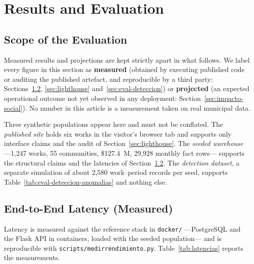 \documentclass[runningheads]{llncs}
\renewcommand{\_}{\origunderscore\allowbreak}
\begin{document}
\section{Results and Evaluation}
\label{sec:resultados}

\subsection{Scope of the Evaluation}
\label{sec:alcance}
\begingroup
Measured results and projections are kept strictly apart in what follows. We label every figure in this section as \textbf{measured} (obtained by executing published code or auditing the published artefact, and reproducible by a third party: Sections~\ref{sec:objetivos}, \ref{sec:lighthouse} and~\ref{sec:eval-deteccion}) or \textbf{projected} (an expected operational outcome not yet observed in any deployment: Section~\ref{sec:impacto-social}). No number in this article is a measurement taken on real municipal data.

Three synthetic populations appear here and must not be conflated. The
\emph{published site} holds six works in the visitor's browser tab and supports
only interface claims and the audit of Section~\ref{sec:lighthouse}. The
\emph{seeded warehouse} ---1,247 works, 55 communities, \$127.4~M, 29,928
monthly fact rows--- supports the structural claims and the latencies of
Section~\ref{sec:objetivos}. The \emph{detection dataset}, a separate simulation
of about 2,580 work--period records per seed, supports
Table~\ref{tab:eval-deteccion-anomalias} and nothing else.
\endgroup


\subsection{End-to-End Latency (Measured)}
\label{sec:objetivos}

Latency is measured against the reference stack in \texttt{docker/} ---PostgreSQL
and the Flask API in containers, loaded with the seeded population--- and is
reproducible with \texttt{scripts/medir\_rendimiento.py}. Table~\ref{tab:latencias} reports the measurements.
\end{document}
